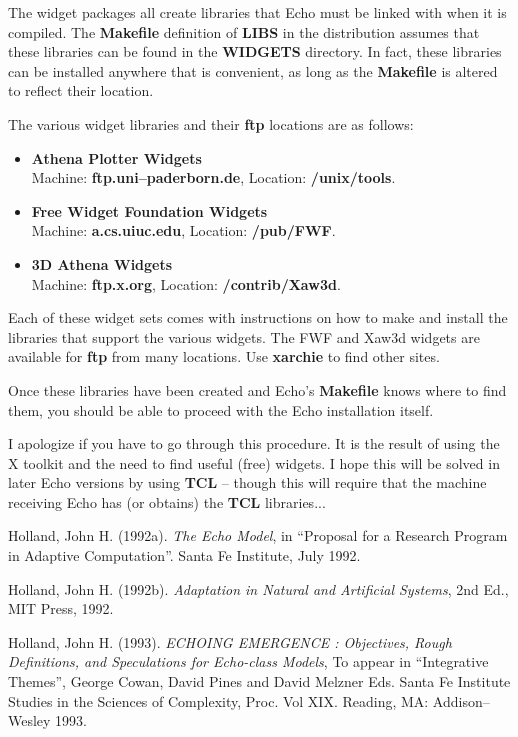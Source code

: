 The widget packages all create libraries that Echo must be linked with
when it is compiled. The {\bf Makefile} definition of {\bf LIBS} in
the distribution assumes that these libraries can be found in the {\bf
WIDGETS} directory. In fact, these libraries can be installed anywhere
that is convenient, as long as the {\bf Makefile} is altered to
reflect their location.

The various widget libraries and their {\bf ftp} locations are as
follows:

\begin{itemize}

\item {\bf Athena Plotter Widgets} \\
Machine: {\bf ftp.uni--paderborn.de}, Location: {\bf /unix/tools}.

\item {\bf Free Widget Foundation Widgets} \\
Machine: {\bf a.cs.uiuc.edu}, Location: {\bf /pub/FWF}.

\item {\bf 3D Athena Widgets} \\
Machine: {\bf ftp.x.org}, Location: {\bf /contrib/Xaw3d}.

\end{itemize}

Each of these widget sets comes with instructions on how to make and
install the libraries that support the various widgets. The FWF and
Xaw3d widgets are available for {\bf ftp} from many locations. Use
{\bf xarchie} to find other sites.

Once these libraries have been created and Echo's {\bf Makefile} knows
where to find them, you should be able to proceed with the Echo
installation itself.

I apologize if you have to go through this procedure. It is the result
of using the X toolkit and the need to find useful (free) widgets. I
hope this will be solved in later Echo versions by using {\bf TCL} --
though this will require that the machine receiving Echo has (or
obtains) the {\bf TCL} libraries...

\newpage
\begin{thebibliography}{99}

Holland, John H. (1992a).
{\em The Echo Model},
in ``Proposal for a Research Program in Adaptive Computation''.
Santa Fe Institute, July 1992.

Holland, John H. (1992b).
{\em Adaptation in Natural and Artificial Systems}, 2nd Ed.,
MIT Press, 1992.

Holland, John H. (1993).
{\em ECHOING EMERGENCE : Objectives, Rough Definitions, and
Speculations for Echo-class Models},
To appear in ``Integrative Themes'', George Cowan, David Pines and
David Melzner Eds. Santa Fe Institute Studies in the Sciences of
Complexity, Proc. Vol XIX. Reading, MA: Addison--Wesley 1993.

\end {thebibliography}




